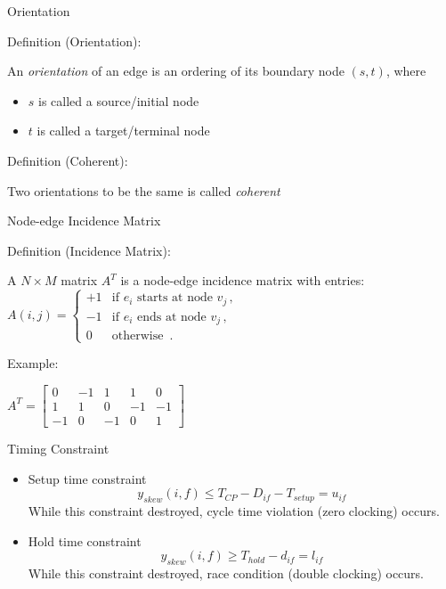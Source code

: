\documentclass[10pt,ignorenonframetext,mathserif]{beamer}
\providecommand{\tightlist}{%
  \setlength{\itemsep}{0pt}\setlength{\parskip}{0pt}}
\begin{document}
\begin{frame}{Orientation}

\begin{block}{Definition (Orientation):}

An \emph{orientation} of an edge is an ordering of its boundary node
\((s, t)\), where

\begin{itemize}
\tightlist
\item
  \(s\) is called a source/initial node
\item
  \(t\) is called a target/terminal node
\end{itemize}

\end{block}

\begin{block}{Definition (Coherent):}

Two orientations to be the same is called \emph{coherent}

\end{block}

\end{frame}

\begin{frame}{Node-edge Incidence Matrix}

\begin{block}{Definition (Incidence Matrix):}

A \(N \times M\) matrix \(A^T\) is a node-edge incidence matrix with
entries:
\(A(i,j) = \begin{cases} +1 & \text{if } e_i \text{ starts at node } v_j \,, \\ -1 & \text{if } e_i \text{ ends at node } v_j \,, \\ 0 & \text{otherwise } \,. \end{cases}\)

\end{block}

\begin{block}{Example:}

\(A^T = \begin{bmatrix} 0 & -1 & 1 & 1 & 0 \\ 1 & 1 & 0 & -1 & -1 \\ -1 & 0 & -1 & 0 & 1 \end{bmatrix}\)

\end{block}

\end{frame}

\begin{frame}{Timing Constraint}

\begin{itemize}
\tightlist
\item
  Setup time constraint
  \[y_{skew}(i,f) \le T_{CP} - D_{if} - T_{setup} = u_{if}\] While this
  constraint destroyed, cycle time violation (zero clocking) occurs.
\item
  Hold time constraint \[y_{skew}(i,f) \ge T_{hold} - d_{if} = l_{if}\]
  While this constraint destroyed, race condition (double clocking)
  occurs.
\end{itemize}

\end{frame}
\end{document}
